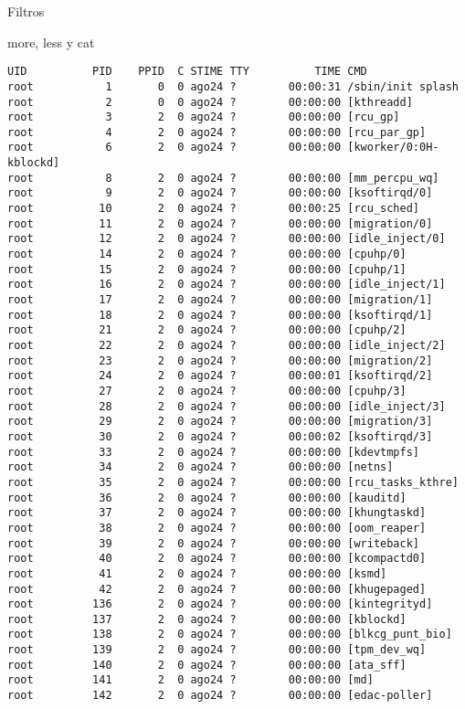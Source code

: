 \begin{section}{Filtros}
\begin{subsection}{more, less y cat}
\begin{lstlisting}[style=Ubuntu]
UID          PID    PPID  C STIME TTY          TIME CMD
root           1       0  0 ago24 ?        00:00:31 /sbin/init splash
root           2       0  0 ago24 ?        00:00:00 [kthreadd]
root           3       2  0 ago24 ?        00:00:00 [rcu_gp]
root           4       2  0 ago24 ?        00:00:00 [rcu_par_gp]
root           6       2  0 ago24 ?        00:00:00 [kworker/0:0H-kblockd]
root           8       2  0 ago24 ?        00:00:00 [mm_percpu_wq]
root           9       2  0 ago24 ?        00:00:00 [ksoftirqd/0]
root          10       2  0 ago24 ?        00:00:25 [rcu_sched]
root          11       2  0 ago24 ?        00:00:00 [migration/0]
root          12       2  0 ago24 ?        00:00:00 [idle_inject/0]
root          14       2  0 ago24 ?        00:00:00 [cpuhp/0]
root          15       2  0 ago24 ?        00:00:00 [cpuhp/1]
root          16       2  0 ago24 ?        00:00:00 [idle_inject/1]
root          17       2  0 ago24 ?        00:00:00 [migration/1]
root          18       2  0 ago24 ?        00:00:00 [ksoftirqd/1]
root          21       2  0 ago24 ?        00:00:00 [cpuhp/2]
root          22       2  0 ago24 ?        00:00:00 [idle_inject/2]
root          23       2  0 ago24 ?        00:00:00 [migration/2]
root          24       2  0 ago24 ?        00:00:01 [ksoftirqd/2]
root          27       2  0 ago24 ?        00:00:00 [cpuhp/3]
root          28       2  0 ago24 ?        00:00:00 [idle_inject/3]
root          29       2  0 ago24 ?        00:00:00 [migration/3]
root          30       2  0 ago24 ?        00:00:02 [ksoftirqd/3]
root          33       2  0 ago24 ?        00:00:00 [kdevtmpfs]
root          34       2  0 ago24 ?        00:00:00 [netns]
root          35       2  0 ago24 ?        00:00:00 [rcu_tasks_kthre]
root          36       2  0 ago24 ?        00:00:00 [kauditd]
root          37       2  0 ago24 ?        00:00:00 [khungtaskd]
root          38       2  0 ago24 ?        00:00:00 [oom_reaper]
root          39       2  0 ago24 ?        00:00:00 [writeback]
root          40       2  0 ago24 ?        00:00:00 [kcompactd0]
root          41       2  0 ago24 ?        00:00:00 [ksmd]
root          42       2  0 ago24 ?        00:00:00 [khugepaged]
root         136       2  0 ago24 ?        00:00:00 [kintegrityd]
root         137       2  0 ago24 ?        00:00:00 [kblockd]
root         138       2  0 ago24 ?        00:00:00 [blkcg_punt_bio]
root         139       2  0 ago24 ?        00:00:00 [tpm_dev_wq]
root         140       2  0 ago24 ?        00:00:00 [ata_sff]
root         141       2  0 ago24 ?        00:00:00 [md]
root         142       2  0 ago24 ?        00:00:00 [edac-poller]

\end{lstlisting}
\end{subsection}
\end{section}
